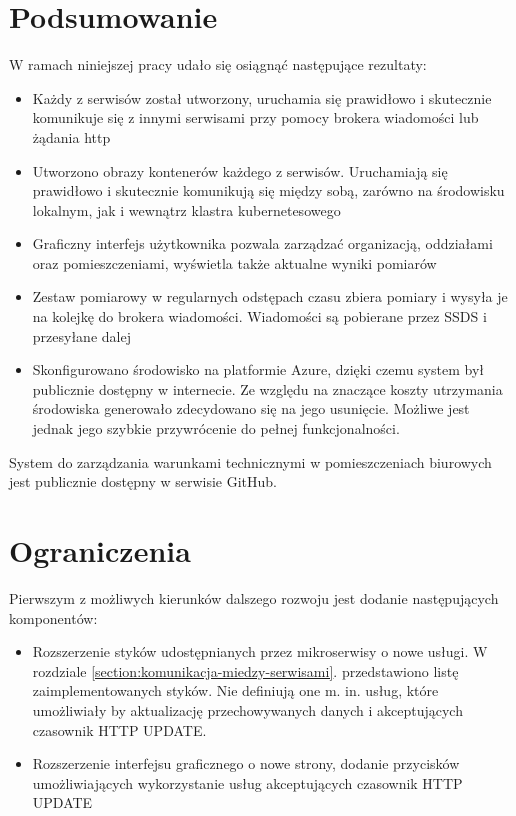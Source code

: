 \clearpage
\section{Podsumowanie}

W ramach niniejszej pracy udało się osiągnąć następujące rezultaty:

\begin{itemize}
    \item Każdy z serwisów został utworzony, uruchamia się prawidłowo i skutecznie
    komunikuje się z innymi serwisami przy pomocy brokera wiadomości lub
    żądania http
    \item Utworzono obrazy kontenerów każdego z serwisów. Uruchamiają się prawidłowo
    i skutecznie komunikują się między sobą, zarówno na środowisku lokalnym, jak
    i wewnątrz klastra kubernetesowego
    \item Graficzny interfejs użytkownika pozwala zarządzać organizacją, oddziałami
    oraz pomieszczeniami, wyświetla także aktualne wyniki pomiarów
    \item Zestaw pomiarowy w regularnych odstępach czasu zbiera pomiary i wysyła je 
    na kolejkę do brokera wiadomości. Wiadomości są pobierane przez SSDS i przesyłane 
    dalej
    \item Skonfigurowano środowisko na platformie Azure, dzięki czemu system
    był publicznie dostępny w internecie. Ze względu na znaczące koszty utrzymania 
    środowiska generowało zdecydowano się na jego usunięcie. Możliwe jest jednak
    jego szybkie przywrócenie do pełnej funkcjonalności.
\end{itemize}

System do zarządzania warunkami technicznymi w pomieszczeniach biurowych jest publicznie
dostępny w serwisie GitHub\cite{github2022}.

\newpage
\section{Ograniczenia}

Pierwszym z możliwych kierunków dalszego rozwoju jest dodanie następujących komponentów:

\begin{itemize}
    \item Rozszerzenie styków udostępnianych przez mikroserwisy o nowe usługi. W rozdziale
    \ref{section:komunikacja-miedzy-serwisami}. przedstawiono listę zaimplementowanych 
    styków. Nie definiują one m. in. usług, które umożliwiały by aktualizację przechowywanych
    danych i akceptujących czasownik HTTP UPDATE.
    \item Rozszerzenie interfejsu graficznego o nowe strony, dodanie przycisków umożliwiających
    wykorzystanie usług akceptujących czasownik HTTP UPDATE
\end{itemize}

